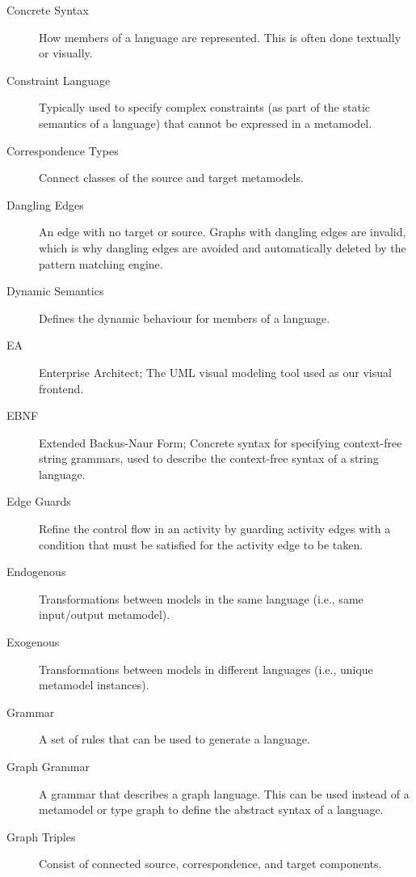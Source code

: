 \begin{description}
\item[Concrete Syntax] %
How members of a language are represented. This is often done textually or visually.

\item[Constraint Language] %
Typically used to specify complex constraints (as part of the static semantics of a language) that cannot be expressed in a metamodel.

\item[Correspondence Types] %
Connect classes of the source and target metamodels.

\item[Dangling Edges] %
An edge with no target or source. Graphs with dangling edges are invalid, which is why dangling edges are avoided and automatically deleted by the pattern
matching engine.

\item[Dynamic Semantics] %
Defines the dynamic behaviour for members of a language.

\item[EA] %
Enterprise Architect; The UML visual modeling tool used as our visual frontend.

\item[EBNF] %
Extended Backus-Naur Form; Concrete syntax for specifying con\-text-free string grammars, used to describe the context-free syntax of a string
language.

\item[Edge Guards] %
Refine the control flow in an activity by guarding activity edges with a condition that must be satisfied for the activity edge to be taken.

\item[Endogenous] %
Transformations between models in the same language (i.e., same input/output metamodel). 
 
\item[Exogenous] %
Transformations between models in different languages (i.e., unique metamodel instances). 

\item[Grammar] %
A set of rules that can be used to generate a language. 

\item[Graph Grammar] %
A grammar that describes a graph language. This can be used instead of a metamodel or type graph to define the abstract syntax of a language.

\item[Graph Triples] %
Consist of connected source, correspondence, and target components.


\end{description}
